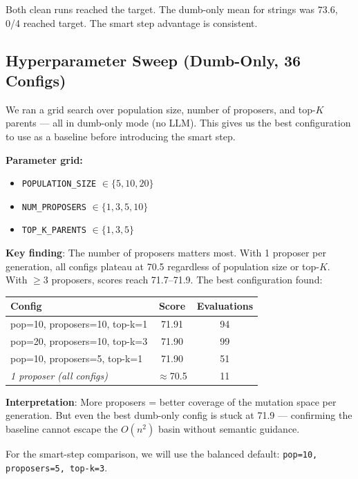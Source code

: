 \documentclass[11pt,a4paper]{article}
\begin{document}
Both clean runs reached the target. The dumb-only mean for strings was
$73.6$, 0/4 reached target. The smart step advantage is consistent.

\subsection{Hyperparameter Sweep (Dumb-Only, 36 Configs)}

We ran a grid search over population size, number of proposers, and top-$K$
parents — all in dumb-only mode (no LLM). This gives us the best configuration
to use as a baseline before introducing the smart step.

\textbf{Parameter grid:}
\begin{itemize}
  \item \texttt{POPULATION\_SIZE} $\in \{5, 10, 20\}$
  \item \texttt{NUM\_PROPOSERS} $\in \{1, 3, 5, 10\}$
  \item \texttt{TOP\_K\_PARENTS} $\in \{1, 3, 5\}$
\end{itemize}

\textbf{Key finding}: The number of proposers matters most. With 1 proposer
per generation, all configs plateau at 70.5 regardless of population size or
top-$K$. With $\geq 3$ proposers, scores reach 71.7--71.9. The best
configuration found:

\begin{center}
\begin{tabular}{lcc}
\toprule
\textbf{Config} & \textbf{Score} & \textbf{Evaluations} \\
\midrule
pop=10, proposers=10, top-k=1 & 71.91 & 94 \\
pop=20, proposers=10, top-k=3 & 71.90 & 99 \\
pop=10, proposers=5,  top-k=1 & 71.90 & 51 \\
\midrule
\textit{1 proposer (all configs)} & $\approx$70.5 & 11 \\
\bottomrule
\end{tabular}
\end{center}

\textbf{Interpretation}: More proposers = better coverage of the mutation space
per generation. But even the best dumb-only config is stuck at 71.9 — confirming
the baseline cannot escape the $O(n^2)$ basin without semantic guidance.

For the smart-step comparison, we will use the balanced default:
\texttt{pop=10, proposers=5, top-k=3}.
\end{document}
